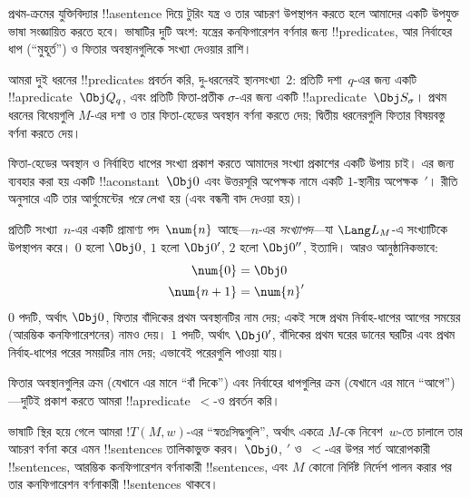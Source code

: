 \documentclass[../../../include/open-logic-section]{subfiles}
\begin{document}

\begin{explain}
প্রথম-ক্রমের যুক্তিবিদ্যার !!a{sentence} দিয়ে টুরিং যন্ত্র ও তার আচরণ
উপস্থাপন করতে হলে আমাদের একটি উপযুক্ত ভাষা সংজ্ঞায়িত করতে হবে। ভাষাটির
দুটি অংশ: যন্ত্রের কনফিগারেশন বর্ণনার জন্য !!{predicate}s, আর নির্বাহের ধাপ
(“মুহূর্ত”) ও ফিতার অবস্থানগুলিকে সংখ্যা দেওয়ার রাশি।

আমরা দুই ধরনের !!{predicate}s প্রবর্তন করি, দু-ধরনেরই স্থানসংখ্যা~2: প্রতিটি
দশা~$q$-এর জন্য একটি !!a{predicate}~$\Obj Q_q$, এবং প্রতিটি ফিতা-প্রতীক
$\sigma$-এর জন্য একটি !!a{predicate}~$\Obj S_\sigma$। প্রথম ধরনের বিধেয়গুলি
$M$-এর দশা ও তার ফিতা-হেডের অবস্থান বর্ণনা করতে দেয়; দ্বিতীয় ধরনেরগুলি
ফিতার বিষয়বস্তু বর্ণনা করতে দেয়।

ফিতা-হেডের অবস্থান ও নির্বাহিত ধাপের সংখ্যা প্রকাশ করতে আমাদের সংখ্যা
প্রকাশের একটি উপায় চাই। এর জন্য ব্যবহার করা হয় একটি !!a{constant}~$\Obj 0$
এবং উত্তরসূরি অপেক্ষক নামে একটি $1$-স্থানীয় অপেক্ষক~$\prime$। রীতি অনুসারে এটি
তার আর্গুমেন্টের \emph{পরে} লেখা হয় (এবং বন্ধনী বাদ দেওয়া হয়)।

প্রতিটি সংখ্যা~$n$-এর একটি প্রামাণ্য পদ~$\num{n}$ আছে—$n$-এর
\emph{সংখ্যাপদ}—যা $\Lang L_M$-এ সংখ্যাটিকে উপস্থাপন করে। $\num{0}$ হলো
$\Obj 0$, $\num{1}$ হলো $\Obj 0'$, $\num{2}$ হলো $\Obj 0''$, ইত্যাদি। আরও
আনুষ্ঠানিকভাবে:
\begin{align*}
\num{0} & = \Obj 0 \\
\num{n+1} &= \num{n}'
\end{align*}
$\num{0}$ পদটি, অর্থাৎ $\Obj 0$, ফিতার বাঁদিকের প্রথম অবস্থানটির নাম দেয়;
একই সঙ্গে প্রথম নির্বাহ-ধাপের আগের সময়ের (আরম্ভিক কনফিগারেশনের) নামও দেয়।
$\num{1}$ পদটি, অর্থাৎ $\Obj 0'$, বাঁদিকের প্রথম ঘরের ডানের ঘরটির এবং প্রথম
নির্বাহ-ধাপের পরের সময়টির নাম দেয়; এভাবেই পরেরগুলি পাওয়া যায়।

ফিতার অবস্থানগুলির ক্রম (যেখানে এর মানে “বাঁ দিকে”) এবং নির্বাহের ধাপগুলির
ক্রম (যেখানে এর মানে “আগে”)—দুটিই প্রকাশ করতে আমরা !!a{predicate}~$<$-ও
প্রবর্তন করি।

ভাষাটি স্থির হয়ে গেলে আমরা $!T(M,w)$-এর “স্বতঃসিদ্ধগুলি”, অর্থাৎ একত্রে
$M$-কে নিবেশ~$w$-তে চালালে তার আচরণ বর্ণনা করে এমন !!{sentence}s তালিকাভুক্ত
করব। $\Obj 0$, $\prime$ ও~$<$-এর উপর শর্ত আরোপকারী !!{sentence}s, আরম্ভিক
কনফিগারেশন বর্ণনাকারী !!{sentence}s, এবং $M$ কোনো নির্দিষ্ট নির্দেশ পালন করার
পর তার কনফিগারেশন বর্ণনাকারী !!{sentence}s থাকবে।
\end{explain}
\end{document}
